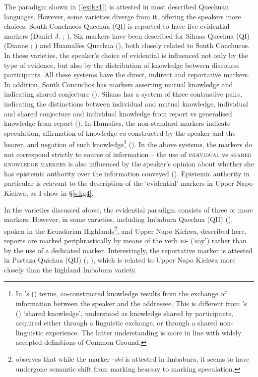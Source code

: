 \documentclass[output=paper]{langscibook}
\begin{document}
The paradigm shown in (\ref{ex:kg1}) is attested in most described Quechuan languages. However, some varieties diverge from it, offering the speakers more choices. South Conchucos Quechua (QI) is reported to have five evidential markers (Daniel J. \citeyear{DanielHintz2012}; \citeyear{Hintz2014}). Six markers have been described for Sihuas Quechua (QI) (Dianne \citeyear{DianneHintz2012}; \citealt{Hintz2014}) and Huamalíes Quechua (\citealt{Howard2012}), both closely related to South Conchucos. In these varieties, the speaker’s choice of evidential is influenced not only by the type of evidence, but also by the distribution of knowledge between discourse participants.  All these systems have the direct, indirect and reportative markers. In addition, South Concuchos has markers asserting mutual knowledge and indicating shared conjecture (\citealt{Hintz2014}). Sihuas has a system of three contrastive pairs, indicating the distinctions between individual and mutual knowledge, individual and shared conjecture and individual knowledge from report vs generalised knowledge from report (\citealt{Hintz2014}). In Humalíes, the non-standard markers indicate speculation, affirmation of knowledge co-constructed by the speaker and the hearer, and negation of such knowledge\footnote{In \citeauthor{Howard2012}'s (\citeyear{Howard2012}) terms, co-constructed knowledge results from the exchange of information between the speaker and the addressee. This is different from \citeauthor{Hintz2014}'s (\citeyear{Hintz2014}) ‘shared knowledge’, understood as knowledge shared by participants, acquired either through a linguistic exchange, or through a shared non-linguistic experience. The latter understanding is more in line with widely accepted definitions of Common Ground.} (\citealt{Howard2012}). In the above systems, the markers do not correspond strictly to source of information – the use of \textsc{individual} vs \textsc{shared knowledge markers} is also influenced by the speaker’s opinion about whether she has epistemic authority over the information conveyed (\citealt[8]{Hintz2014}). Epistemic authority in particular is relevant to the description of the ‘evidential’ markers in Upper Napo Kichwa, as I show in §‎\ref{s:kg4}.

In the varieties discussed above, the evidential paradigm consists of three or more markers. However, in some varieties, including Imbabura Quechua (QII) (\citealt[164--165]{Cole1982}), spoken in the Ecuadorian Highlands\footnote{\cite[165]{Cole1982} observes that while the marker -\textit{shi} is attested in Imbabura, it seems to have undergone semantic shift from marking hearsay to marking speculation.}, and Upper Napo Kichwa, described here, reports are marked periphrastically by means of the verb \textit{ni}- (‘say’) rather than by the use of a dedicated marker. Interestingly, the reportative marker is attested in Pastaza Quichua (QII) (\citealt{Nuckolls1993}; \citealt{Nuckolls2012}), which is related to Upper Napo Kichwa more closely than the highland Imbabura variety.
\end{document}
